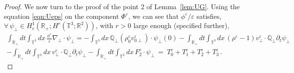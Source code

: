 \documentclass[11pt,reqno]{amsart}
\def \R{{\mathbb{R}}}
\def \Q{{\mathbb{Q}}}
\def \T{{\mathbb{T}}}
\begin{document}
\begin{proof}
We now turn to the proof of the point 2 of Lemma~\ref{lem:UG}. Using the equation \eqref{eqn:Ueps} on the component $ \Phi^\varepsilon$, we can see that $\phi^\varepsilon/\varepsilon$ satisfies, $\forall \,\psi_\perp \in H_c^1(\R_+; H^r(\T^3;\R^2))$, with $r>0$ large enough (specified further),
\begin{multline}
  \label{eqn:SPT}
  \int_{\R_+} dt \int_{\T^3}dx \, \frac{\phi^\varepsilon}{\varepsilon} \nabla_\perp \cdot \psi_\perp
  =  -\int_{\T^3}dx \, \Q_\perp(\rho_0^\varepsilon v_{0\perp}^\varepsilon)\cdot \psi_\perp(0)
  -\int_{\R_+}  dt \int_{\T^3}dx \, (\rho^\varepsilon -1)v_\perp^\varepsilon \cdot \Q_\perp \partial_t\psi_\perp
   \\ 
   - \int_{\R_+}  dt \int_{\T^3}dx \, v_\perp^\varepsilon \cdot \Q_\perp \partial_t \psi_\perp
  - \int_{\R_+}  dt \int_{\T^3}dx \, F_2^\varepsilon \cdot  \psi_\perp 
  \ = \ T_0^\varepsilon + T_1^\varepsilon +T_2^\varepsilon +T_3^\varepsilon\,. 
\end{multline}

\end{proof}
\end{document}
